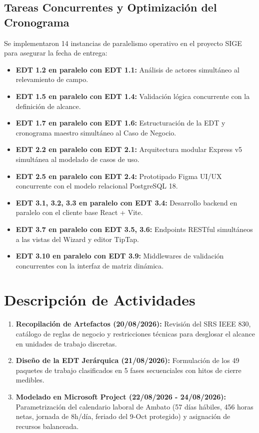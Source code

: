 \documentclass[12pt,a4paper]{article}
\begin{document}
\subsection{Tareas Concurrentes y Optimización del Cronograma}
Se implementaron 14 instancias de paralelismo operativo en el proyecto SIGE para asegurar la fecha de entrega:
\begin{itemize}[leftmargin=1.5em, itemsep=1.5pt, topsep=1.5pt]
    \item \textbf{EDT 1.2 en paralelo con EDT 1.1:} Análisis de actores simultáneo al relevamiento de campo.
    \item \textbf{EDT 1.5 en paralelo con EDT 1.4:} Validación lógica concurrente con la definición de alcance.
    \item \textbf{EDT 1.7 en paralelo con EDT 1.6:} Estructuración de la EDT y cronograma maestro simultáneo al Caso de Negocio.
    \item \textbf{EDT 2.2 en paralelo con EDT 2.1:} Arquitectura modular Express v5 simultánea al modelado de casos de uso.
    \item \textbf{EDT 2.5 en paralelo con EDT 2.4:} Prototipado Figma UI/UX concurrente con el modelo relacional PostgreSQL 18.
    \item \textbf{EDT 3.1, 3.2, 3.3 en paralelo con EDT 3.4:} Desarrollo backend en paralelo con el cliente base React + Vite.
    \item \textbf{EDT 3.7 en paralelo con EDT 3.5, 3.6:} Endpoints RESTful simultáneos a las vistas del Wizard y editor TipTap.
    \item \textbf{EDT 3.10 en paralelo con EDT 3.9:} Middlewares de validación concurrentes con la interfaz de matriz dinámica.
\end{itemize}

\section{Descripción de Actividades}
\begin{enumerate}[leftmargin=1.5em, itemsep=2pt, topsep=2pt]
    \item \textbf{Recopilación de Artefactos (20/08/2026):} Revisión del SRS IEEE 830, catálogo de reglas de negocio y restricciones técnicas para desglosar el alcance en unidades de trabajo discretas.
    \item \textbf{Diseño de la EDT Jerárquica (21/08/2026):} Formulación de los 49 paquetes de trabajo clasificados en 5 fases secuenciales con hitos de cierre medibles.
    \item \textbf{Modelado en Microsoft Project (22/08/2026 - 24/08/2026):} Parametrización del calendario laboral de Ambato (57 días hábiles, 456 horas netas, jornada de 8h/día, feriado del 9-Oct protegido) y asignación de recursos balanceada.
\end{enumerate}
\end{document}
